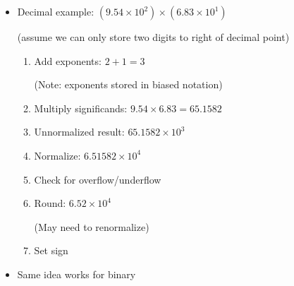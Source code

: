     


    

\begin{frame}[fragile]
\begin{itemize}
\item Decimal example: $(9.54 \times 10^2) \times (6.83 \times 10^1)$

(assume we can only store two digits to right of decimal point)
\begin{enumerate}
\item Add exponents: $2+1=3$

	(Note: exponents stored in biased notation)
\item Multiply significands: $9.54 \times 6.83 = 65.1582$
\item Unnormalized result: $65.1582 \times 10^3$
\item Normalize: $6.51582 \times 10^4$
\item Check for overflow/underflow
\item Round: $6.52 \times 10^4$

      (May need to renormalize)
\item Set sign
\end{enumerate}
\item Same idea works for binary
\end{itemize}
\BNotes\ifnum{}
~%
\fi\ENotes
\end{frame}

